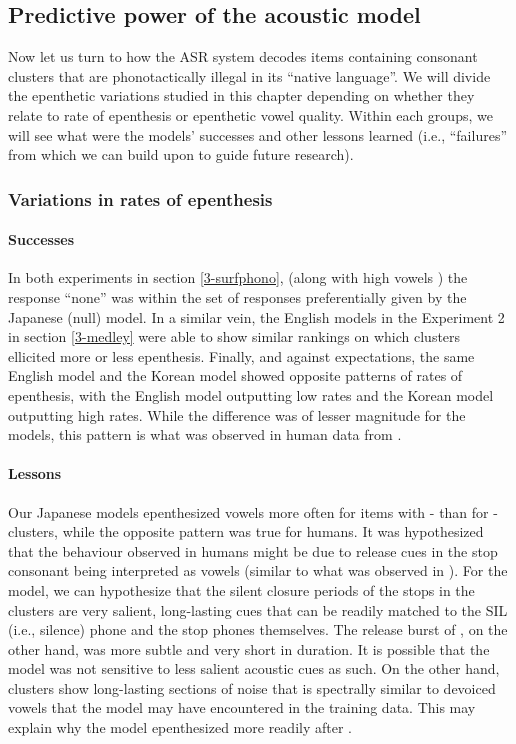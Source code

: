 {%
\subsection{Predictive power of the acoustic model}
Now let us turn to how the ASR system decodes items containing consonant clusters that are phonotactically illegal in its ``native language''. We will divide the epenthetic variations studied in this chapter depending on whether they relate to rate of epenthesis or epenthetic vowel quality. Within each groups, we will see what were the models' successes and other lessons learned (i.e., ``failures'' from which we can build upon to guide future research).   

\subsubsection{Variations in rates of epenthesis}
\paragraph{Successes}
In both experiments in section \ref{3-surfphono}, (along with high vowels ) the response ``none'' was within the set of responses preferentially given by the Japanese (null) model. In a similar vein, the English models in the Experiment 2 in section \ref{3-medley} were able to show similar rankings on which clusters ellicited more or less epenthesis. Finally, and against expectations, the same English model and the Korean model showed opposite patterns of rates of epenthesis, with the English model outputting low rates and the Korean model outputting high rates. While the difference was of lesser magnitude for the models, this pattern is what was observed in human data from \cite{durvasula2015}.    

\paragraph{Lessons}
Our Japanese models epenthesized vowels more often for items with - than for -clusters, while the opposite pattern was true for humans. It was hypothesized that the behaviour observed in humans might be due to release cues in the stop consonant  being interpreted as vowels (similar to what was observed in \cite{dejong2012}). For the model, we can hypothesize that the silent closure periods of the stops in the  clusters are very salient, long-lasting cues that can be readily matched to the SIL (i.e., silence) phone and the stop phones themselves. The release burst of , on the other hand, was more subtle and very short in duration. It is possible that the model was not sensitive to less salient acoustic cues as such. On the other hand,  clusters show long-lasting sections of noise that is spectrally similar to devoiced vowels that the model may have encountered in the training data. This may explain why the model epenthesized more readily after .

}
